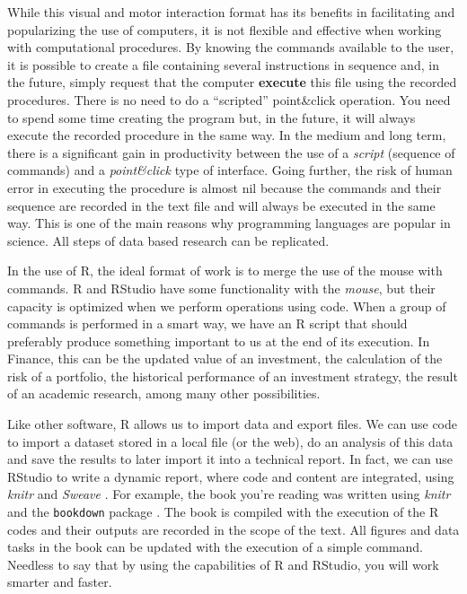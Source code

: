 \documentclass[11pt,]{book}
\begin{document}
While this visual and motor interaction format has its benefits in
facilitating and popularizing the use of computers, it is not flexible
and effective when working with computational procedures. By knowing the
commands available to the user, it is possible to create a file
containing several instructions in sequence and, in the future, simply
request that the computer \textbf{execute} this file using the recorded
procedures. There is no need to do a ``scripted'' point\&click
operation. You need to spend some time creating the program but, in the
future, it will always execute the recorded procedure in the same way.
In the medium and long term, there is a significant gain in productivity
between the use of a \emph{script} (sequence of commands) and a
\emph{point\&click} type of interface. Going further, the risk of human
error in executing the procedure is almost nil because the commands and
their sequence are recorded in the text file and will always be executed
in the same way. This is one of the main reasons why programming
languages are popular in science. All steps of data based research can
be replicated.

In the use of R, the ideal format of work is to merge the use of the
mouse with commands. R and RStudio have some functionality with the
\emph{mouse}, but their capacity is optimized when we perform operations
using code. When a group of commands is performed in a smart way, we
have an R script that should preferably produce something important to
us at the end of its execution. In Finance, this can be the updated
value of an investment, the calculation of the risk of a portfolio, the
historical performance of an investment strategy, the result of an
academic research, among many other possibilities.

Like other software, R allows us to import data and export files. We can
use code to import a dataset stored in a local file (or the web), do an
analysis of this data and save the results to later import it into a
technical report. In fact, we can use RStudio to write a dynamic report,
where code and content are integrated, using \emph{knitr} and
\emph{Sweave} \citep{leisch2002sweave}. For example, the book you're
reading was written using \emph{knitr} and the \texttt{bookdown} package
\citep{xie2016bookdown}. The book is compiled with the execution of the
R codes and their outputs are recorded in the scope of the text. All
figures and data tasks in the book can be updated with the execution of
a simple command. Needless to say that by using the capabilities of R
and RStudio, you will work smarter and faster. 
\end{document}
